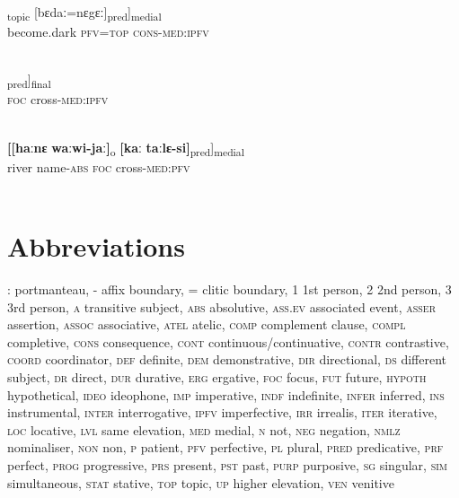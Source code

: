 \documentclass[output=paper]{LSP/langsci}
\begin{document}
\begin{exe}
\ex \label{Aiex:App50}
\gll [\textbf{[[soːlo}	\textbf{di=jaː]}\textsubscript{pred}]\textsubscript{topic}	[bɛdaː=nɛgɛː]\textsubscript{pred}]\textsubscript{medial}\\
become.dark	\textsc{pfv}=\textsc{top}	\textsc{cons}-\textsc{med}:\textsc{ipfv}\\
\glt {}\\
\end{exe}

\begin{exe}
\ex \label{Aiex:App51}
\gll \underline{\smash{[[kaː}}	\underline{\smash{taː=nɛgɛː]}}\textsubscript{pred}]\textsubscript{final}\\
\textsc{foc}	cross-\textsc{med:ipfv}\\
\glt {}\\
\end{exe}

\begin{exe}
\ex \label{Aiex:App52}
\gll \textbf{[[haːnɛ}	\textbf{waːwi-jaː]}\textsubscript{o}	\textbf{[kaː}	\textbf{taːlɛ-si]}\textsubscript{pred}]\textsubscript{medial}\\
river	name-\textsc{abs}	\textsc{foc}	cross-\textsc{med}:\textsc{pfv}\\
\glt {}\\
\end{exe}

\section*{ Abbreviations}

\textsc{:} portmanteau,
\textsc{-} affix boundary,
\textsc{=} clitic boundary,
\textsc{1} 1st person,
\textsc{2} 2nd person,
\textsc{3} 3rd person,
\textsc{a} transitive subject,
\textsc{abs} absolutive,
\textsc{ass.ev} associated event,
\textsc{asser} assertion,
\textsc{assoc} associative,
\textsc{atel} atelic,
\textsc{comp} complement clause,
\textsc{compl} completive,
\textsc{cons} consequence,
\textsc{cont} continuous/continuative,
\textsc{contr} contrastive,
\textsc{coord} coordinator,
\textsc{def} definite,
\textsc{dem} demonstrative,
\textsc{dir} directional,
\textsc{ds} different subject,
\textsc{dr} direct,
\textsc{dur} durative,
\textsc{erg} ergative,
\textsc{foc} focus,
\textsc{fut} future,
\textsc{hypoth} hypothetical,
\textsc{ideo} ideophone,
\textsc{imp} imperative,
\textsc{indf} indefinite,
\textsc{infer} inferred,
\textsc{ins} instrumental,
\textsc{inter} interrogative,
\textsc{ipfv} imperfective,
\textsc{irr} irrealis,
\textsc{iter} iterative,
\textsc{loc} locative,
\textsc{lvl} same elevation,
\textsc{med} medial,
\textsc{n} not,
\textsc{neg} negation,
\textsc{nmlz} nominaliser,
\textsc{non} non,
\textsc{p} patient,
\textsc{pfv} perfective,
\textsc{pl} plural,
\textsc{pred} predicative,
\textsc{prf} perfect,
\textsc{prog} progressive,
\textsc{prs} present,
\textsc{pst} past,
\textsc{purp} purposive,
\textsc{sg} singular,
\textsc{sim} simultaneous,
\textsc{stat} stative,
\textsc{top} topic,
\textsc{up} higher elevation,
\textsc{ven} venitive
\end{document}
